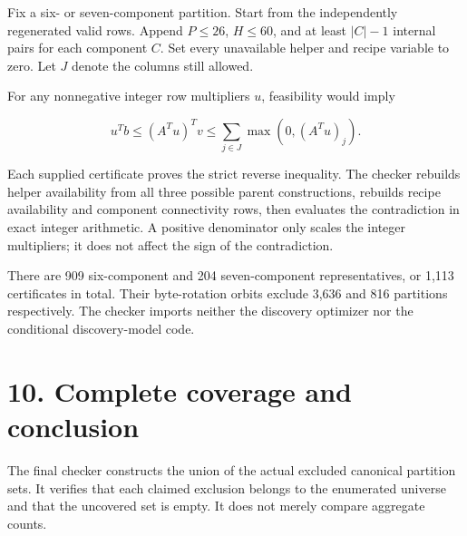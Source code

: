 Fix a six- or seven-component partition. Start from the independently regenerated valid rows. Append \(P\leq26\), \(H\leq60\), and at least \(|C|-1\) internal pairs for each component \(C\). Set every unavailable helper and recipe variable to zero. Let \(J\) denote the columns still allowed.

For any nonnegative integer row multipliers \(u\), feasibility would imply

\[u^Tb\leq(A^Tu)^Tv\leq\sum_{j\in J}\max(0,(A^Tu)_j).\]

Each supplied certificate proves the strict reverse inequality. The checker rebuilds helper availability from all three possible parent constructions, rebuilds recipe availability and component connectivity rows, then evaluates the contradiction in exact integer arithmetic. A positive denominator only scales the integer multipliers; it does not affect the sign of the contradiction.

There are 909 six-component and 204 seven-component representatives, or 1,113 certificates in total. Their byte-rotation orbits exclude 3,636 and 816 partitions respectively. The checker imports neither the discovery optimizer nor the conditional discovery-model code.

\hypertarget{complete-coverage-and-conclusion}{%
\section{10. Complete coverage and conclusion}\label{complete-coverage-and-conclusion}}

The final checker constructs the union of the actual excluded canonical partition sets. It verifies that each claimed exclusion belongs to the enumerated universe and that the uncovered set is empty. It does not merely compare aggregate counts.

